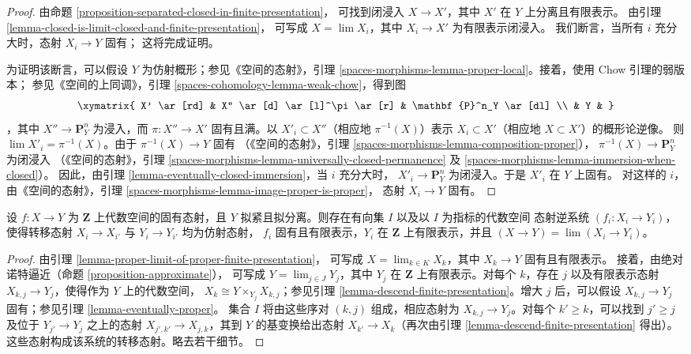 \begin{proof}
由命题 \ref{proposition-separated-closed-in-finite-presentation}，
可找到闭浸入 $X \to X'$，其中 $X'$ 在 $Y$ 上分离且有限表示。
由引理 \ref{lemma-closed-is-limit-closed-and-finite-presentation}，
可写成 $X = \lim X_i$，其中 $X_i \to X'$ 为有限表示闭浸入。
我们断言，当所有 $i$ 充分大时，态射 $X_i \to Y$ 固有；
这将完成证明。

\medskip\noindent
为证明该断言，可以假设 $Y$ 为仿射概形；参见《空间的态射》，引理
\ref{spaces-morphisms-lemma-proper-local}。接着，使用 Chow 引理的弱版本；
参见《空间的上同调》，引理
\ref{spaces-cohomology-lemma-weak-chow}，得到图
$$
\xymatrix{
X' \ar[rd] & X'' \ar[d] \ar[l]^\pi \ar[r] & \mathbf{P}^n_Y \ar[dl] \\
& Y &
}
$$
，其中 $X'' \to \mathbf{P}^n_Y$ 为浸入，而
$\pi : X'' \to X'$ 固有且满。以
$X'_i \subset X''$（相应地 $\pi^{-1}(X)$）表示
$X_i \subset X'$（相应地 $X \subset X'$）的概形论逆像。
则 $\lim X'_i = \pi^{-1}(X)$。由于 $\pi^{-1}(X) \to Y$ 固有
（《空间的态射》，引理
\ref{spaces-morphisms-lemma-composition-proper}），
$\pi^{-1}(X) \to \mathbf{P}^n_Y$ 为闭浸入
（《空间的态射》，引理
\ref{spaces-morphisms-lemma-universally-closed-permanence} 及
\ref{spaces-morphisms-lemma-immersion-when-closed}）。
因此，由引理 \ref{lemma-eventually-closed-immersion}，当 $i$ 充分大时，
$X'_i \to \mathbf{P}^n_Y$ 为闭浸入。于是 $X'_i$ 在 $Y$ 上固有。
对这样的 $i$，由《空间的态射》，引理
\ref{spaces-morphisms-lemma-image-proper-is-proper}，
态射 $X_i \to Y$ 固有。
\end{proof}

\begin{lemma}
\label{lemma-proper-limit-of-proper-finite-presentation-noetherian}
设 $f : X \to Y$ 为 $\mathbf{Z}$ 上代数空间的固有态射，且
$Y$ 拟紧且拟分离。则存在有向集 $I$ 以及以 $I$ 为指标的代数空间
态射逆系统 $(f_i : X_i \to Y_i)$，使得转移态射
$X_i \to X_{i'}$ 与 $Y_i \to Y_{i'}$ 均为仿射态射，
$f_i$ 固有且有限表示，$Y_i$ 在 $\mathbf{Z}$ 上有限表示，并且
$(X \to Y) = \lim (X_i \to Y_i)$。
\end{lemma}

\begin{proof}
由引理 \ref{lemma-proper-limit-of-proper-finite-presentation}，
可写成 $X = \lim_{k \in K} X_k$，其中 $X_k \to Y$ 固有且有限表示。
接着，由绝对诺特逼近（命题 \ref{proposition-approximate}），
可写成 $Y = \lim_{j \in J} Y_j$，其中 $Y_j$ 在 $\mathbf{Z}$
上有限表示。对每个 $k$，存在 $j$ 以及有限表示态射
$X_{k,j} \to Y_j$，使得作为 $Y$ 上的代数空间，
$X_k \cong Y \times_{Y_j} X_{k,j}$；参见引理
\ref{lemma-descend-finite-presentation}。增大 $j$ 后，可以假设
$X_{k,j} \to Y_j$ 固有；参见引理 \ref{lemma-eventually-proper}。
集合 $I$ 将由这些序对 $(k,j)$ 组成，相应态射为
$X_{k,j} \to Y_j$。对每个 $k' \geq k$，可以找到 $j' \geq j$
及位于 $Y_{j'} \to Y_j$ 之上的态射
$X_{j',k'} \to X_{j,k}$，其到 $Y$ 的基变换给出态射
$X_{k'} \to X_k$（再次由引理
\ref{lemma-descend-finite-presentation} 得出）。
这些态射构成该系统的转移态射。略去若干细节。
\end{proof}

